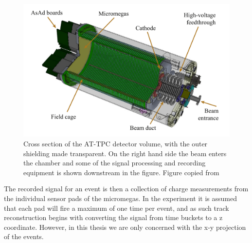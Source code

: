  \begin{figure}
 \centering
 \includegraphics[width=\textwidth]{../plots/at_tpc_schematic}
 \caption[AT-TPC cross-section]{Cross section of the AT-TPC detector volume, with the outer shielding made transparent. On the right hand side the beam enters the chamber and some of the signal processing and recording equipment is shown downstream in the figure. Figure copied from \cite{Bradt2017a}}\label{fig:attpc_schematic}
 \end{figure}

The recorded signal for an event is then a collection of charge measurements from the individual sensor pads of the micromegas. In the experiment it is assumed that each pad will fire a maximum of one time per event, and as such track reconstruction begins with converting the signal from time buckets to a z coordinate. However, in this thesis we are only concerned with the x-y projection of the events. 
